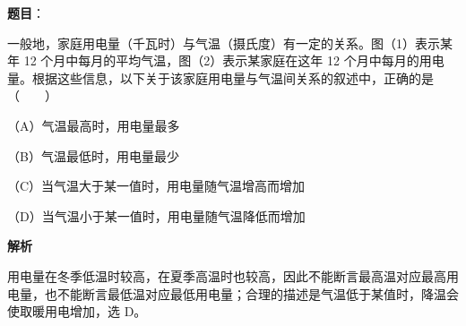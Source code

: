 \begin{answer}

\textbf{题目}：

一般地，家庭用电量（千瓦时）与气温（摄氏度）有一定的关系。图（1）表示某年 12 个月中每月的平均气温，图（2）表示某家庭在这年 12 个月中每月的用电量。根据这些信息，以下关于该家庭用电量与气温间关系的叙述中，正确的是\mbox{（　　）}
\nopagebreak[4]
\begin{center}\end{center}
\nopagebreak[4]
（A）气温最高时，用电量最多

（B）气温最低时，用电量最少

（C）当气温大于某一值时，用电量随气温增高而增加

（D）当气温小于某一值时，用电量随气温降低而增加

\textbf{解析}

用电量在冬季低温时较高，在夏季高温时也较高，因此不能断言最高温对应最高用电量，也不能断言最低温对应最低用电量；合理的描述是气温低于某值时，降温会使取暖用电增加，选 D。


\end{answer}

